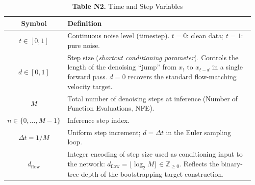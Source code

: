 \begin{table}[h]
\centering
\caption*{\textbf{Table N2.} Time and Step Variables}
\begin{tabular}{@{} c p{10cm} @{}}
\toprule
\textbf{Symbol} & \textbf{Definition} \\
\midrule
$t \in [0,1]$
  & Continuous noise level (timestep).
    $t=0$: clean data; $t=1$: pure noise. \\
$d \in [0,1]$
  & Step size (\textit{shortcut conditioning parameter}).
    Controls the length of the denoising ``jump'' from $x_t$ to
    $x_{t-d}$ in a single forward pass.
    $d=0$ recovers the standard flow-matching velocity target. \\
$M$
  & Total number of denoising steps at inference
    (Number of Function Evaluations, NFE). \\
$n \in \{0,\ldots,M-1\}$
  & Inference step index. \\
$\Delta t = 1/M$
  & Uniform step increment; $d = \Delta t$ in the Euler sampling loop. \\
$d_{\mathrm{flow}}$
  & Integer encoding of step size used as conditioning input to the
    network:
    $d_{\mathrm{flow}} = \lfloor \log_2 M \rfloor \in \mathbb{Z}_{\geq 0}$.
    Reflects the binary-tree depth of the bootstrapping target
    construction. \\
\bottomrule
\end{tabular}
\end{table}

